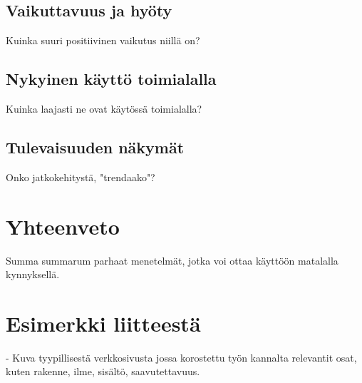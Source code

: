 \documentclass[finnish, 12pt, a4paper, elec, utf8, a-1b, online]{aaltothesis}
\begin{document}
\subsection{Vaikuttavuus ja hyöty}

Kuinka suuri positiivinen vaikutus niillä on?

\subsection{Nykyinen käyttö toimialalla}

Kuinka laajasti ne ovat käytössä toimialalla?

\subsection{Tulevaisuuden näkymät}

Onko jatkokehitystä, "trendaako"?

\clearpage

\section{Yhteenveto}

Summa summarum parhaat menetelmät, jotka voi ottaa käyttöön matalalla
kynnyksellä.

\clearpage

\thesisbibliography{}
\printbibliography{}

\clearpage
\thesisappendix{}

\section{Esimerkki liitteestä\label{LiiteA}}

- Kuva tyypillisestä verkkosivusta jossa korostettu työn kannalta relevantit
osat, kuten rakenne, ilme, sisältö, saavutettavuus.
\end{document}
